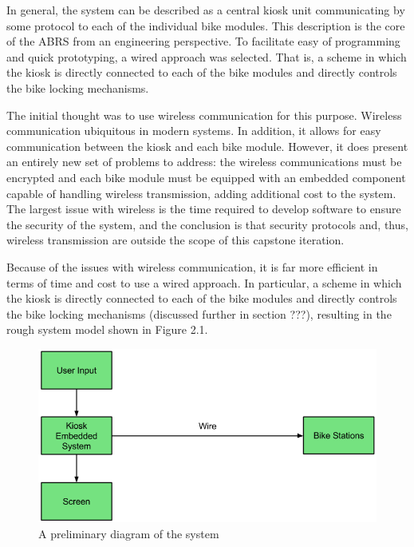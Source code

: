 \documentclass[11pt,a4paper,onesides]{report}
\begin{document}
In general, the system can be described as a central kiosk unit communicating by some protocol to each of the individual bike modules.  This description is the core of the ABRS from an engineering perspective.  To facilitate easy of programming and quick prototyping, a wired approach was selected.  That is, a scheme in which the kiosk is directly connected to each of the bike modules and directly controls the bike locking mechanisms.  

The initial thought was to use wireless communication for this purpose.  Wireless communication ubiquitous in modern systems.  In addition, it allows for easy communication between the kiosk and each bike module.  However, it does present an entirely new set of problems to address: the wireless communications must be encrypted and each bike module must be equipped with an embedded component capable of handling wireless transmission, adding additional cost to the system.  The largest issue with wireless is the time required to develop software to ensure the security of the system, and the conclusion is that security protocols and, thus, wireless transmission are outside the scope of this capstone iteration.  

Because of the issues with wireless communication,  it is far more efficient in terms of time and cost to use a wired approach.  In particular, a scheme in which the kiosk is directly connected to each of the bike modules and directly controls the bike locking mechanisms (discussed further in section ???), resulting in the rough system model shown in Figure 2.1. 


\begin{figure}[h]
	\begin{center}
		\includegraphics[scale = 0.6]{initial-diagram}
	\end{center}
\caption{A preliminary diagram of the system}

\end{figure}
\end{document}
